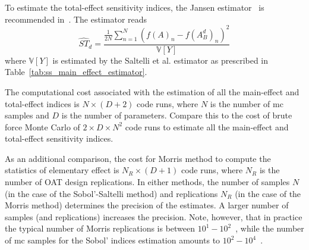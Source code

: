 To estimate the total-effect sensitivity indices, the Jansen estimator~\cite{Jansen1999} is recommended in~\cite{Saltelli2010a}.
The estimator reads
\begin{equation}
  \widehat{ST}_d = \frac{\frac{1}{2N}\sum_{n=1}^{N}\left(f(A)_n - f(A_B^d)_n\right)^2}{\mathbb{V}[Y]}
\label{eq:ss_jansen_estimator}
\end{equation}
where $\mathbb{V}[Y]$ is estimated by the Saltelli et al. estimator as prescribed in Table~\ref{tab:ss_main_effect_estimator}.

The computational cost associated with the estimation of all the main-effect and total-effect indices is $N \times (D + 2)$ code runs,
where $N$ is the number of \gls{mc} samples and $D$ is the number of parameters.
Compare this to the cost of brute force Monte Carlo of $2 \times D \times N^2$ code runs to estimate all the main-effect and total-effect sensitivity indices. 

As an additional comparison, the cost for Morris method to compute the statistics of elementary effect is $N_R \times (D + 1)$ code runs,
where $N_R$ is the number of OAT design replications.
In either methods, the number of samples $N$ (in the case of the Sobol'-Saltelli method) and replications $N_R$ (in the case of the Morris method)
determines the precision of the estimates.
A larger number of samples (and replications) increases the precision.
Note, however, that in practice the typical number of Morris replications is between $10^1 - 10^2$~\cite{Saltelli2010}, 
while the number of \gls{mc} samples for the Sobol' indices estimation amounts to $10^2 - 10^4$~\cite{Sobol2001}.
